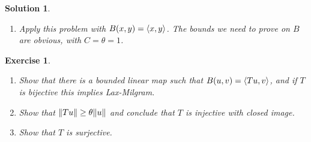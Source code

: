 \documentclass{article}
\newtheorem{ex}{Exercise}
\theoremstyle{nonumberplain}
\newtheorem{sol}{Solution}
\newcommand{\R}{\mathbb{R}}
\DeclarePairedDelimiter{\Norm}{\lVert}{\rVert}
\DeclarePairedDelimiter{\braket}{\langle}{\rangle}
\begin{document}
\begin{sol}
\begin{enumerate}
Thus, let $m = \inf_{x \in H} F(x) = \inf_{\Norm x \leq R} F(x)$. Pick a sequence $x_n$ with $\Norm x \leq R$ and $F(x_n) \to m$. This is a bounded sequence, and $H$ is reflexive, so by passing to a subsequence we may assume that $x_n$ converges weakly to some $x$ with $\Norm x \leq R$. We claim that such an $x$ is our minimizer.

To proceed, it is important to note that $B \colon H \times H \to \R$ is an inner product on $H$. Indeed, it is bilinear and symmetric, and the condition $B(x,x) \geq \Theta \Norm{x}^2$ gives us positivity of $B$. As such, Cauchy-Schwarz holds, and we have the bound $B(x,x) B(y,y) \geq B(x,y)^2$. This is important because then we have
\begin{equation}\label{eq:b}
B(x,x) B(x_n,x_n) \geq B(x,x_n)^2 \to B(x,x)^2.
\end{equation}

Now, we conclude that $\liminf B(x_n,x_n) \geq B(x,x)$: either $x = 0$ in which case this is trivially true, or $x \neq 0$ and so we may divide out by $B(x,x)$ in \eqref{eq:b} and take the $\liminf$ on both sides to obtain the desired result. As such, since moreover $\lim \phi(x_n) = \phi(x)$, we conclude
\begin{equation}
\lim F(x_n) = \lim B(x_n,x_n) + 2 \lim \phi(x_n) \geq B(x,x) + \phi(x) = F(x).
\end{equation}

This `sandwiches' $F(x)$ between $\lim F(x_n) = m$ from above, and $m$ from below (by definition of $m$), and thus $F(x) = m$ and so $x$ is indeed a minimizer of $F$.

\smallskip

To prove the desired formula for $\phi$, pick some $v \in H$ and note that $F(x + tv)$, $t \in \R$, has its minimum at $t = 0$. Thus, taking the derivative at zero will yield zero, and this derivative is given by
\begin{equation}
\diff{}t[0] \left( B(x+tv,x+tv) - 2 \phi(x+tv) \right) = 2 B(x,v) - 2 \phi(v),
\end{equation}
and since this is null we obtain the desired formula for $\phi$.

\item Apply this problem with $B(x,y) = \braket{x,y}$. The bounds we need to prove on $B$ are obvious, with $C = \theta = 1$.
\end{enumerate}
\end{sol}

\begin{ex}
\leavevmode
\begin{enumerate}
\item Show that there is a bounded linear map such that $B(u,v) = \braket{Tu,v}$, and if $T$ is bijective this implies Lax-Milgram.
\item Show that $\Norm{Tu} \geq \theta \Norm u$ and conclude that $T$ is injective with closed image.
\item Show that $T$ is surjective.
\end{enumerate}
\end{ex}
\end{document}

